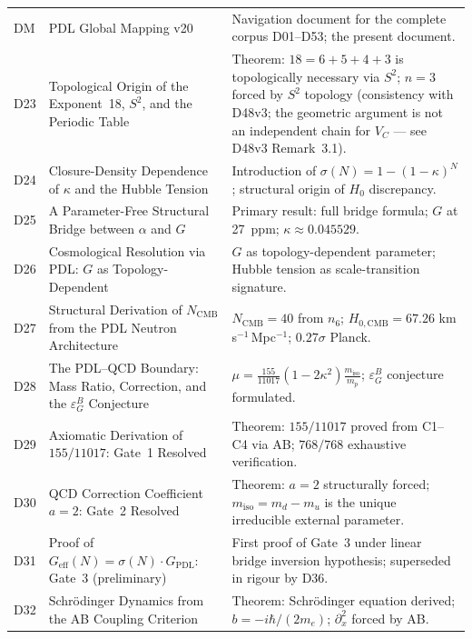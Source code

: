 \documentclass[11pt,a4paper]{article}
\theoremstyle{plain}
\theoremstyle{definition}
\theoremstyle{remark}
\newcommand{\Geff}{G_{\mathrm{eff}}}
\newcommand{\GPDL}{G_{\mathrm{PDL}}}
\newcommand{\sigmaN}{\sigma(N)}
\newcommand{\epsGeomB}{\varepsilon_G^B}
\begin{document}
\begin{longtable}{L{1.3cm}L{3.8cm}L{8.0cm}}
DM & PDL Global Mapping v20~\cite{DMapv10} & Navigation document for the complete corpus D01--D53; the present document.\\[0.3em]
D23 & Topological Origin of the Exponent~18, $S^2$, and the Periodic Table~\cite{D23} & \textcolor{proofblue}{Theorem}: $18=6+5+4+3$ is topologically necessary via $S^2$; $n=3$ forced by $S^2$ topology (consistency with D48v3; the geometric argument is not an independent chain for $V_C$ --- see D48v3 Remark~3.1).\\[0.3em]
D24 & Closure-Density Dependence of $\kappa$ and the Hubble Tension~\cite{D24} & Introduction of $\sigma(N)=1-(1-\kappa)^N$; structural origin of $H_0$ discrepancy.\\[0.3em]
D25 & A Parameter-Free Structural Bridge between $\alpha$ and $G$~\cite{D25} & \textcolor{proofblue}{Primary result}: full bridge formula; $G$ at 27~ppm; $\kappa\approx 0.045529$.\\[0.3em]
D26 & Cosmological Resolution via PDL: $G$ as Topology-Dependent~\cite{D26} & $G$ as topology-dependent parameter; Hubble tension as scale-transition signature.\\[0.3em]
D27 & Structural Derivation of $N_{\mathrm{CMB}}$ from the PDL Neutron Architecture~\cite{D27} & $N_{\mathrm{CMB}}=40$ from $n_6$; $H_{0,\mathrm{CMB}}=67.26$ km\,s$^{-1}$\,Mpc$^{-1}$; $0.27\sigma$ Planck.\\[0.3em]
D28 & The PDL--QCD Boundary: Mass Ratio, Correction, and the $\epsGeomB$ Conjecture~\cite{D28} & $\mu = \frac{155}{11017}(1-2\kappa^2)\frac{m_{\mathrm{iso}}}{m_p}$; $\epsGeomB$ conjecture formulated.\\[0.3em]
D29 & Axiomatic Derivation of $155/11017$: Gate~1 Resolved~\cite{D29} & \textcolor{proofblue}{Theorem}: $155/11017$ proved from C1--C4 via AB; $768/768$ exhaustive verification.\\[0.3em]
D30 & QCD Correction Coefficient $a=2$: Gate~2 Resolved~\cite{D30} & \textcolor{proofblue}{Theorem}: $a=2$ structurally forced; $m_{\mathrm{iso}}=m_d-m_u$ is the unique irreducible external parameter.\\[0.3em]
D31 & Proof of $\Geff(N)=\sigmaN\cdot\GPDL$: Gate~3 (preliminary)~\cite{D31} & First proof of Gate~3 under linear bridge inversion hypothesis; superseded in rigour by D36.\\[0.3em]
D32 & Schr\"odinger Dynamics from the AB Coupling Criterion~\cite{D32} & \textcolor{proofblue}{Theorem}: Schr\"odinger equation derived; $b=-i\hbar/(2m_e)$; $\partial_x^2$ forced by AB.\\[0.3em]

\end{longtable}
\end{document}
